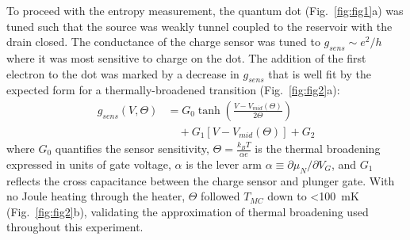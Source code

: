 \documentclass[twocolumn,showpacs,amsmath,amssymb,prl,aps,superscriptaddress]{revtex4-1}
\begin{document}
To proceed with the entropy measurement, the quantum dot (Fig.~\ref{fig:fig1}a) was tuned such that the source was weakly tunnel coupled to the reservoir with the drain closed.   The conductance of the charge sensor was tuned to $g_{sens}{\sim}e^2/h$ where it was most sensitive to charge on the dot.  The addition of the first electron to the dot was marked by a decrease in $g_{sens}$ that is well fit by the expected form for a thermally-broadened transition (Fig.~\ref{fig:fig2}a):
%
\begin{align}
\label{eqn:g}
        g_{sens}(V,\Theta) &= G_0 \tanh\left(\frac{V-V_{mid}(\Theta)}{2\Theta}\right)  \\
                        &\quad + G_1\left[V-V_{mid}(\Theta)\right] + G_2 \nonumber
\end{align}
%
where $G_0$ quantifies the sensor sensitivity, $\Theta = \frac{k_B T}{\alpha e}$ is the thermal broadening expressed in units of gate voltage, $\alpha$ is the lever arm $\alpha\equiv\partial \mu_{N}/\partial V_G$, and $G_1$ reflects the cross capacitance between the charge sensor and plunger gate. With no Joule heating through the heater, $\Theta$ followed $T_{MC}$ down to \SI{<100}{\milli\kelvin} (Fig.~\ref{fig:fig2}b), validating the approximation of thermal broadening used throughout this experiment.

\end{document}
